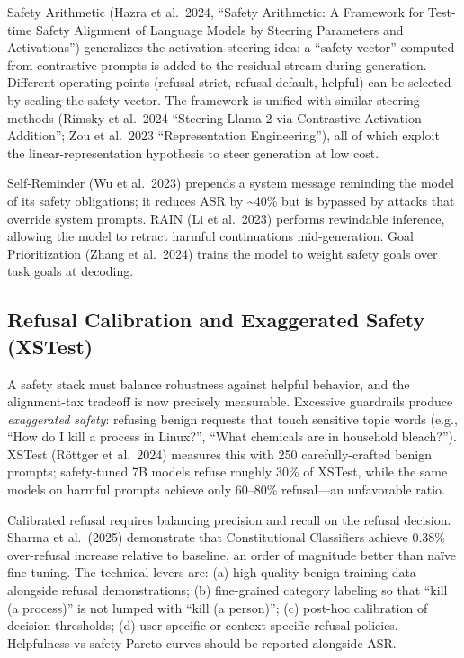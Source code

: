 \documentclass{article}
\begin{document}
Safety Arithmetic (Hazra et al.~2024, ``Safety Arithmetic: A Framework for Test-time Safety Alignment of Language Models by Steering Parameters and Activations'') generalizes the activation-steering idea: a ``safety vector'' computed from contrastive prompts is added to the residual stream during generation. Different operating points (refusal-strict, refusal-default, helpful) can be selected by scaling the safety vector. The framework is unified with similar steering methods (Rimsky et al.~2024 ``Steering Llama 2 via Contrastive Activation Addition''; Zou et al.~2023 ``Representation Engineering''), all of which exploit the linear-representation hypothesis to steer generation at low cost.

Self-Reminder (Wu et al.~2023) prepends a system message reminding the model of its safety obligations; it reduces ASR by \textasciitilde40\% but is bypassed by attacks that override system prompts. RAIN (Li et al.~2023) performs rewindable inference, allowing the model to retract harmful continuations mid-generation. Goal Prioritization (Zhang et al.~2024) trains the model to weight safety goals over task goals at decoding.

\subsection{Refusal Calibration and Exaggerated Safety (XSTest)}\label{refusal-calibration-and-exaggerated-safety-xstest}

A safety stack must balance robustness against helpful behavior, and the alignment-tax tradeoff is now precisely measurable. Excessive guardrails produce \emph{exaggerated safety}: refusing benign requests that touch sensitive topic words (e.g., ``How do I kill a process in Linux?'', ``What chemicals are in household bleach?''). XSTest (Röttger et al.~2024) measures this with 250 carefully-crafted benign prompts; safety-tuned 7B models refuse roughly 30\% of XSTest, while the same models on harmful prompts achieve only 60--80\% refusal---an unfavorable ratio.

Calibrated refusal requires balancing precision and recall on the refusal decision. Sharma et al.~(2025) demonstrate that Constitutional Classifiers achieve 0.38\% over-refusal increase relative to baseline, an order of magnitude better than naïve fine-tuning. The technical levers are: (a) high-quality benign training data alongside refusal demonstrations; (b) fine-grained category labeling so that ``kill (a process)'' is not lumped with ``kill (a person)''; (c) post-hoc calibration of decision thresholds; (d) user-specific or context-specific refusal policies. Helpfulness-vs-safety Pareto curves should be reported alongside ASR.
\end{document}
